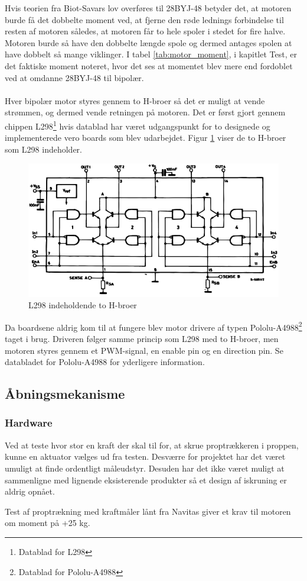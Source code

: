 \noindent
Hvis teorien fra Biot-Savars lov overføres til 28BYJ-48 betyder det, at motoren burde få det dobbelte moment ved, at fjerne den røde lednings forbindelse til resten af motoren således, at motoren får to hele spoler i stedet for fire halve. Motoren burde så have den dobbelte længde spole og dermed antages spolen at have dobbelt så mange viklinger. I tabel \ref{tab:motor_moment}, i kapitlet Test, er det faktiske moment noteret, hvor det ses at momentet blev mere end fordoblet ved at omdanne 28BYJ-48 til bipolær.
\\
\\
Hver bipolær motor styres gennem to H-broer så det er muligt at vende strømmen, og dermed vende retningen på motoren. Det er først gjort gennem chippen L298\footnote{Datablad for L298} hvis datablad har været udgangspunkt for to designede og implementerede vero boards som blev udarbejdet. Figur \ref{fig:L298} viser de to H-broer som L298 indeholder.

\begin{figure}[H]
	\centerline{\includegraphics[scale=0.33]{tex/Design/L298}}
	\caption{L298 indeholdende to H-broer}
	\label{fig:L298}
\end{figure}

\noindent
Da boardsene aldrig kom til at fungere blev motor drivere af typen Pololu-A4988\footnote{Datablad for Pololu-A4988} taget i brug. Driveren følger samme princip som L298 med to H-broer, men motoren styres gennem et PWM-signal, en enable pin og en direction pin. Se databladet for Pololu-A4988 for yderligere information.

\subsection{Åbningsmekanisme}
\subsubsection{Hardware}
Ved at teste hvor stor en kraft der skal til for, at skrue proptrækkeren i proppen, kunne en aktuator vælges ud fra testen. Desværre for projektet har det været umuligt at finde ordentligt måleudstyr. Desuden har det ikke været muligt at sammenligne med lignende eksisterende produkter så et design af iskruning er aldrig opnået.

Test af proptrækning med kraftmåler lånt fra Navitas giver et krav til motoren om moment på +25 kg.